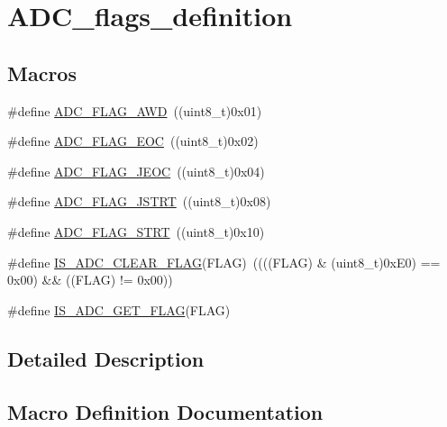 \hypertarget{group___a_d_c__flags__definition}{}\section{A\+D\+C\+\_\+flags\+\_\+definition}
\label{group___a_d_c__flags__definition}
\subsection*{Macros}
\begin{DoxyCompactItemize}
\item 
\#define \mbox{\hyperlink{group___a_d_c__flags__definition_gadb75a4b430fb84950232b7a8f3a6a877}{A\+D\+C\+\_\+\+F\+L\+A\+G\+\_\+\+A\+WD}}~((uint8\+\_\+t)0x01)
\item 
\#define \mbox{\hyperlink{group___a_d_c__flags__definition_gaf2c6fdf7e9ab63b778149e5fb56413d4}{A\+D\+C\+\_\+\+F\+L\+A\+G\+\_\+\+E\+OC}}~((uint8\+\_\+t)0x02)
\item 
\#define \mbox{\hyperlink{group___a_d_c__flags__definition_ga4df8eea8ab83d98104ee15a339743a4e}{A\+D\+C\+\_\+\+F\+L\+A\+G\+\_\+\+J\+E\+OC}}~((uint8\+\_\+t)0x04)
\item 
\#define \mbox{\hyperlink{group___a_d_c__flags__definition_ga278f4e866f4322c1120bf0db5301c432}{A\+D\+C\+\_\+\+F\+L\+A\+G\+\_\+\+J\+S\+T\+RT}}~((uint8\+\_\+t)0x08)
\item 
\#define \mbox{\hyperlink{group___a_d_c__flags__definition_gad0c59ae7749c69b5b91f2c533db1b619}{A\+D\+C\+\_\+\+F\+L\+A\+G\+\_\+\+S\+T\+RT}}~((uint8\+\_\+t)0x10)
\item 
\#define \mbox{\hyperlink{group___a_d_c__flags__definition_gac5b6fb60ec921255b05261ec04573470}{I\+S\+\_\+\+A\+D\+C\+\_\+\+C\+L\+E\+A\+R\+\_\+\+F\+L\+AG}}(F\+L\+AG)~((((F\+L\+AG) \& (uint8\+\_\+t)0x\+E0) == 0x00) \&\& ((\+F\+L\+A\+G) != 0x00))
\item 
\#define \mbox{\hyperlink{group___a_d_c__flags__definition_ga597eb68dfef9dbe0928ed14a1aedc710}{I\+S\+\_\+\+A\+D\+C\+\_\+\+G\+E\+T\+\_\+\+F\+L\+AG}}(F\+L\+AG)
\end{DoxyCompactItemize}


\subsection{Detailed Description}


\subsection{Macro Definition Documentation}
\mbox{\label{group___a_d_c__flags__definition_gadb75a4b430fb84950232b7a8f3a6a877}} 
